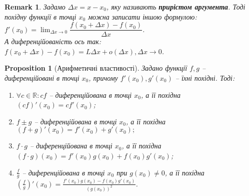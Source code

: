 \documentclass[a4paper, 14pt]{article}
\theoremstyle{theoremdd}
\theoremstyle{theoremdd}
\theoremstyle{theoremdd}
\theoremstyle{theoremdd}
\theoremstyle{theoremdd}
\newtheorem{proposition}[theorem]{Proposition}
\theoremstyle{theoremdd}
\newtheorem{remark}[theorem]{Remark}
\theoremstyle{theoremdd}
\theoremstyle{theoremdd}
\begin{document}
\begin{remark}
Задамо $\Delta x = x - x_0$, яку називають \textbf{прирістом аргумента}. Тоді похідну функції в точці $x_0$ можна записати іншою формулою: $f'(x_0) = \displaystyle\lim_{\Delta x \to 0} \dfrac{f(x_0+\Delta x) - f(x_0)}{\Delta x}$. \\
А диференційованість ось так: $f(x_0+\Delta x) - f(x_0) = L \Delta x + o(\Delta x), \Delta x \to 0$.
\end{remark}

\begin{proposition}[Арифметичні властивості]
Задано функції $f,g$ -- диференційовані в точці $x_0$, причому $f'(x_0),g'(x_0)$ -- їхні похідні. Тоді:
\begin{enumerate}[nosep,wide=0pt,label={\arabic*)}]
\item $\forall c \in \mathbb{R}: cf$ -- диференційована в точці $x_0$, а її похідна
$(cf)'(x_0) = cf'(x_0)$;
\item $f \pm g$ -- диференційована в точці $x_0$, а її похідна
$(f+g)'(x_0)=f'(x_0)+g'(x_0);$
\item $f \cdot g$ -- диференційована в точці $x_0$, а її похідна
$(f \cdot g)(x_0) = f'(x_0)g(x_0)+f(x_0)g'(x_0)$;
\item $\displaystyle \frac{f}{g}$ -- диференційована в точці $x_0$ при $g(x_0) \neq 0$, а її похідна
$\displaystyle \left(\frac{f}{g}\right)'(x_0) = \frac{f'(x_0)g(x_0)-f(x_0)g'(x_0)}{(g(x_0))^2}$.
\end{enumerate}
\end{proposition}
\end{document}
